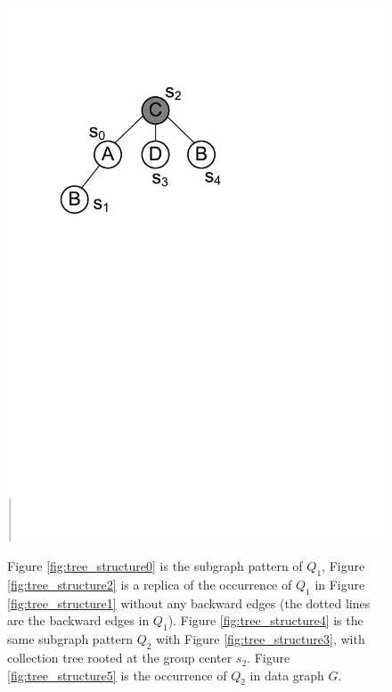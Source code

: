 \begin{figure}[t!]
{\includegraphics[scale=0.33]{images/tree_structure4}
\label{fig:tree_structure4}
}
\vspace{-2mm}
\caption{\scriptsize Figure \ref{fig:tree_structure0} is the subgraph pattern of $Q_1$, Figure \ref{fig:tree_structure2} is a replica of the occurrence of $Q_1$ in Figure \ref{fig:tree_structure1} without any backward edges (the dotted lines are the backward edges in $Q_1$). Figure \ref{fig:tree_structure4} is the same subgraph pattern $Q_2$ with Figure \ref{fig:tree_structure3}, with collection tree rooted at the group center $s_2$. Figure \ref{fig:tree_structure5} is the occurrence of $Q_2$ in data graph $G$.}
\label{fig:replica}
\vspace{-6mm}
\end{figure}
